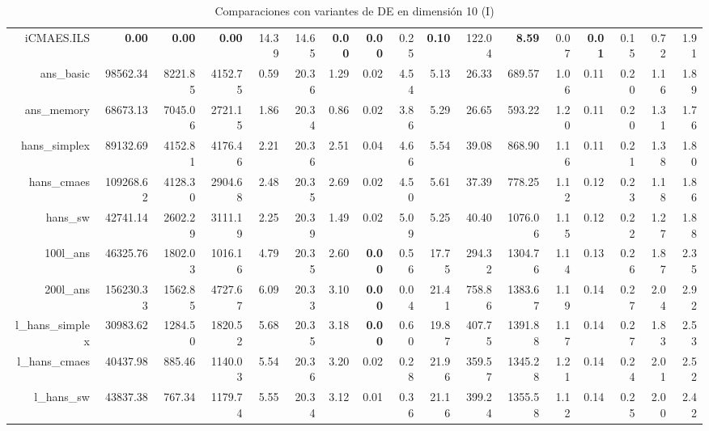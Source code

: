 \begin{table}[h!]
\begin{tabular}{rrrrrrrrrrrrrrrrr}
  iCMAES.ILS & \textbf{0.00} & \textbf{0.00} & \textbf{0.00} & 14.39 & 14.65 & \textbf{0.00} & \textbf{0.00} & 0.25 & \textbf{0.10} & 122.04 & \textbf{8.59} & 0.07 & \textbf{0.01} & 0.15 & 0.72 & 1.91 \\ 
  ans\_basic & 98562.34 & 8221.85 & 4152.75 & 0.59 & 20.36 & 1.29 & 0.02 & 4.54 & 5.13 & 26.33 & 689.57 & 1.06 & 0.11 & 0.20 & 1.16 & 1.89 \\ 
  ans\_memory & 68673.13 & 7045.06 & 2721.15 & 1.86 & 20.34 & 0.86 & 0.02 & 3.86 & 5.29 & 26.65 & 593.22 & 1.20 & 0.11 & 0.20 & 1.31 & 1.76 \\ 
  hans\_simplex & 89132.69 & 4152.81 & 4176.46 & 2.21 & 20.36 & 2.51 & 0.04 & 4.66 & 5.54 & 39.08 & 868.90 & 1.16 & 0.11 & 0.21 & 1.38 & 1.80 \\ 
  hans\_cmaes & 109268.62 & 4128.30 & 2904.68 & 2.48 & 20.35 & 2.69 & 0.02 & 4.50 & 5.61 & 37.39 & 778.25 & 1.12 & 0.12 & 0.23 & 1.18 & 1.86 \\ 
  hans\_sw & 42741.14 & 2602.29 & 3111.19 & 2.25 & 20.39 & 1.49 & 0.02 & 5.09 & 5.25 & 40.40 & 1076.06 & 1.15 & 0.12 & 0.22 & 1.27 & 1.88 \\ 
  100l\_ans & 46325.76 & 1802.03 & 1016.16 & 4.79 & 20.35 & 2.60 & \textbf{0.00} & 0.56 & 17.75 & 294.32 & 1304.76 & 1.14 & 0.13 & 0.26 & 1.87 & 2.35 \\ 
  200l\_ans & 156230.33 & 1562.85 & 4727.67 & 6.09 & 20.33 & 3.10 & \textbf{0.00} & 0.04 & 21.41 & 758.86 & 1383.67 & 1.19 & 0.14 & 0.27 & 2.04 & 2.92 \\ 
  l\_hans\_simplex & 30983.62 & 1284.50 & 1820.52 & 5.68 & 20.35 & 3.18 & \textbf{0.00} & 0.60 & 19.87 & 407.75 & 1391.88 & 1.17 & 0.14 & 0.27 & 1.83 & 2.53 \\ 
  l\_hans\_cmaes & 40437.98 & 885.46 & 1140.03 & 5.54 & 20.36 & 3.20 & 0.02 & 0.28 & 21.96 & 359.57 & 1345.28 & 1.21 & 0.14 & 0.24 & 2.01 & 2.52 \\ 
  l\_hans\_sw & 43837.38 & 767.34 & 1179.74 & 5.55 & 20.34 & 3.12 & 0.01 & 0.36 & 21.16 & 399.24 & 1355.58 & 1.12 & 0.14 & 0.25 & 2.00 & 2.42 \\ 
   \hline
\end{tabular}
\endgroup
\caption{Comparaciones con variantes de DE en dimensión 10 (I)} 
\label{complete10a}
\end{table}
